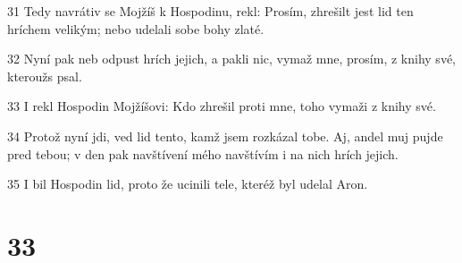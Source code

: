 \par 31 Tedy navrátiv se Mojžíš k Hospodinu, rekl: Prosím, zhrešilt jest lid ten hríchem velikým; nebo udelali sobe bohy zlaté.
\par 32 Nyní pak neb odpust hrích jejich, a pakli nic, vymaž mne, prosím, z knihy své, kteroužs psal.
\par 33 I rekl Hospodin Mojžíšovi: Kdo zhrešil proti mne, toho vymaži z knihy své.
\par 34 Protož nyní jdi, ved lid tento, kamž jsem rozkázal tobe. Aj, andel muj pujde pred tebou; v den pak navštívení mého navštívím i na nich hrích jejich.
\par 35 I bil Hospodin lid, proto že ucinili tele, kteréž byl udelal Aron.

\chapter{33}

